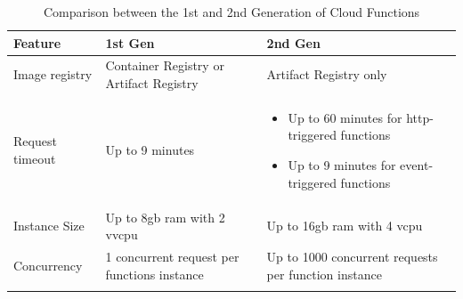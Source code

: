 \begin{longtable}{|p{5cm}|p{5.5cm}|p{5.5cm}|}
      \hline
      \rowcolor{blue!20}
      Feature         & 1st Gen                                                     & 2nd Gen                                                       \\
      \endfirsthead
      \hline
      Image registry  & Container Registry or Artifact Registry                     & Artifact Registry only                                        \\
      \hline
      Request timeout & Up to 9 minutes                                             & \begin{itemize}
                                                                                            \item Up to 60 minutes for \acrshort{http}-triggered functions
                                                                                            \item Up to 9 minutes for event-triggered functions
                                                                                      \end{itemize} \\
      \hline
      Instance Size   & Up to 8\acrshort{gb} \acrshort{ram} with 2 v\acrshort{vcpu} & Up to 16\acrshort{gb} \acrshort{ram} with 4 \acrshort{vcpu}   \\
      \hline
      Concurrency     & 1 concurrent request per functions instance                 & Up to 1000 concurrent requests per function instance          \\
      \hline
      \caption{Comparison between the 1st and 2nd Generation of Cloud Functions}
      \label{tab:restvsoap}
\end{longtable}

